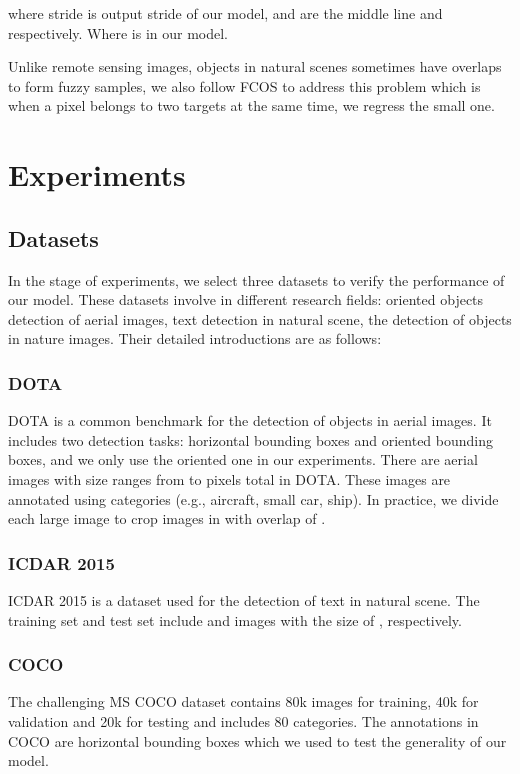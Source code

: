 \documentclass[runningheads]{llncs}
\begin{document}
where stride is output stride of our model,  and  are the middle line  and  respectively. Where  is  in our model. 

Unlike remote sensing images, objects in natural scenes sometimes have overlaps to form fuzzy samples, we also follow FCOS to address this problem which is when a pixel belongs to two targets at the same time, we regress the small one.

\section{Experiments} \label{section:4}

\subsection{Datasets}
In the stage of experiments, we select three datasets to verify the performance of our model. These datasets involve in different research fields: oriented objects detection of aerial images, text detection in natural scene, the detection of objects in nature images. Their detailed introductions are as follows: 

\subsubsection{DOTA}

DOTA\cite{Xia_2018_CVPR} is a common benchmark for the detection of objects in aerial images. It includes two detection tasks: horizontal bounding boxes and oriented bounding boxes, and we only use the oriented one in our experiments. There are  aerial images with size ranges from  to  pixels total in DOTA. These images are annotated using  categories (e.g., aircraft, small car, ship). In practice, we divide each large image to crop images in  with overlap of . 

\subsubsection{ICDAR 2015}
ICDAR 2015\cite{karatzas2015icdar} is a dataset used for the detection of text in natural scene. The training set and test set include  and  images with the size of , respectively. 


\subsubsection{COCO}
The challenging MS COCO\cite{lin2014microsoft} dataset contains 80k images for training, 40k for validation and 20k for testing and includes 80 categories. The annotations in COCO are horizontal bounding boxes which we used to test the generality of our model.
\end{document}
